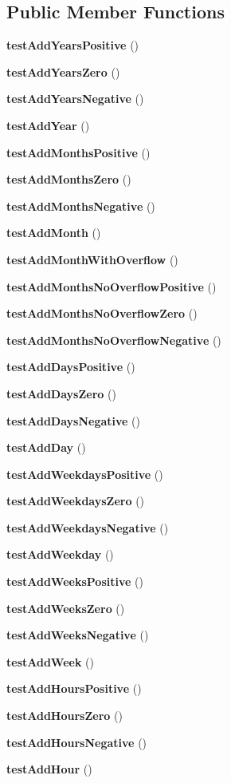 \subsection*{Public Member Functions}
\begin{DoxyCompactItemize}
\item 
{\bf test\+Add\+Years\+Positive} ()
\item 
{\bf test\+Add\+Years\+Zero} ()
\item 
{\bf test\+Add\+Years\+Negative} ()
\item 
{\bf test\+Add\+Year} ()
\item 
{\bf test\+Add\+Months\+Positive} ()
\item 
{\bf test\+Add\+Months\+Zero} ()
\item 
{\bf test\+Add\+Months\+Negative} ()
\item 
{\bf test\+Add\+Month} ()
\item 
{\bf test\+Add\+Month\+With\+Overflow} ()
\item 
{\bf test\+Add\+Months\+No\+Overflow\+Positive} ()
\item 
{\bf test\+Add\+Months\+No\+Overflow\+Zero} ()
\item 
{\bf test\+Add\+Months\+No\+Overflow\+Negative} ()
\item 
{\bf test\+Add\+Days\+Positive} ()
\item 
{\bf test\+Add\+Days\+Zero} ()
\item 
{\bf test\+Add\+Days\+Negative} ()
\item 
{\bf test\+Add\+Day} ()
\item 
{\bf test\+Add\+Weekdays\+Positive} ()
\item 
{\bf test\+Add\+Weekdays\+Zero} ()
\item 
{\bf test\+Add\+Weekdays\+Negative} ()
\item 
{\bf test\+Add\+Weekday} ()
\item 
{\bf test\+Add\+Weeks\+Positive} ()
\item 
{\bf test\+Add\+Weeks\+Zero} ()
\item 
{\bf test\+Add\+Weeks\+Negative} ()
\item 
{\bf test\+Add\+Week} ()
\item 
{\bf test\+Add\+Hours\+Positive} ()
\item 
{\bf test\+Add\+Hours\+Zero} ()
\item 
{\bf test\+Add\+Hours\+Negative} ()
\item 
{\bf test\+Add\+Hour} ()
\item 

\end{DoxyCompactItemize}
